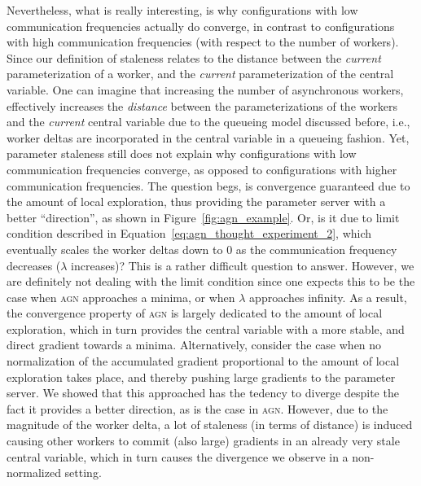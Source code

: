 Nevertheless, what is really interesting, is why configurations with low communication frequencies actually do converge, in contrast to configurations with high communication frequencies (with respect to the number of workers). Since our definition of staleness relates to the distance between the \emph{current} parameterization of a worker, and the \emph{current} parameterization of the central variable. One can imagine that increasing the number of asynchronous workers, effectively increases the \emph{distance} between the parameterizations of the workers and the \emph{current} central variable due to the queueing model discussed before, i.e., worker deltas are incorporated in the central variable in a queueing fashion. Yet, parameter staleness still does not explain why configurations with low communication frequencies converge, as opposed to configurations with higher communication frequencies. The question begs, is convergence guaranteed due to the amount of local exploration, thus providing the parameter server with a better ``direction'', as shown in Figure~\ref{fig:agn_example}. Or, is it due to limit condition described in Equation~\ref{eq:agn_thought_experiment_2}, which eventually scales the worker deltas down to 0 as the communication frequency decreases ($\lambda$ increases)? This is a rather difficult question to answer. However, we are definitely not dealing with the limit condition since one expects this to be the case when \textsc{agn} approaches a minima, or when $\lambda$ approaches infinity. As a result, the convergence property of \textsc{agn} is largely dedicated to the amount of local exploration, which in turn provides the central variable with a more stable, and direct gradient towards a minima. Alternatively, consider the case when no normalization of the accumulated gradient proportional to the amount of local exploration takes place, and thereby pushing large gradients to the parameter server. We showed that this approached has the tedency to diverge despite the fact it provides a better direction, as is the case in \textsc{agn}. However, due to the magnitude of the worker delta, a lot of staleness (in terms of distance) is induced causing other workers to commit (also large) gradients in an already very stale central variable, which in turn causes the divergence we observe in a non-normalized setting.\\

